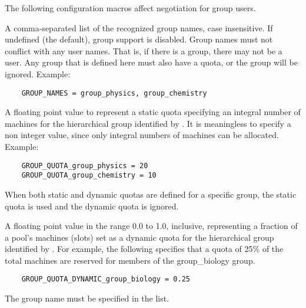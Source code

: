 The following configuration macros affect negotiation for group users.
\begin{description}

\label{param:GroupNames}
\item[\Macro{GROUP\_NAMES}]
  A comma-separated list of the recognized group names, case insensitive.
  If undefined (the default), group support is disabled.
  Group names must not conflict with any user names.
  That is, if there is a \verb@physics@ group, there may not be
  a \verb@physics@ user.
  Any group that is defined here must also have a quota,
  or the group will be ignored. Example: 
  \begin{verbatim}
    GROUP_NAMES = group_physics, group_chemistry 
  \end{verbatim}

\label{param:GroupQuotaGroupname}
\item[\Macro{GROUP\_QUOTA\_<groupname>}]
  A floating point value to represent a static quota specifying
  an integral number of machines for the hierarchical group
  identified by .
  It is meaningless to specify a non integer value, 
  since only integral numbers of machines can be allocated.
  Example:
  \begin{verbatim}
    GROUP_QUOTA_group_physics = 20
    GROUP_QUOTA_group_chemistry = 10
  \end{verbatim}
  When both static and dynamic quotas are defined for a specific group,
  the static quota is used and the dynamic quota is ignored. 

\label{param:GroupQuotaDynamicGroupname}
\item[\Macro{GROUP\_QUOTA\_DYNAMIC\_<groupname>}]
  A floating point value in the range 0.0 to 1.0, inclusive,
  representing a fraction of a pool's machines (slots) set as
  a dynamic quota for the hierarchical group identified by .
  For example, the following
  specifies that a quota of 25\% of the total machines are
  reserved for members of the group\_biology group.
  \begin{verbatim}
  	GROUP_QUOTA_DYNAMIC_group_biology = 0.25
  \end{verbatim}
  The group name must be specified in the  list.
  \MoreTodo


\end{description}
